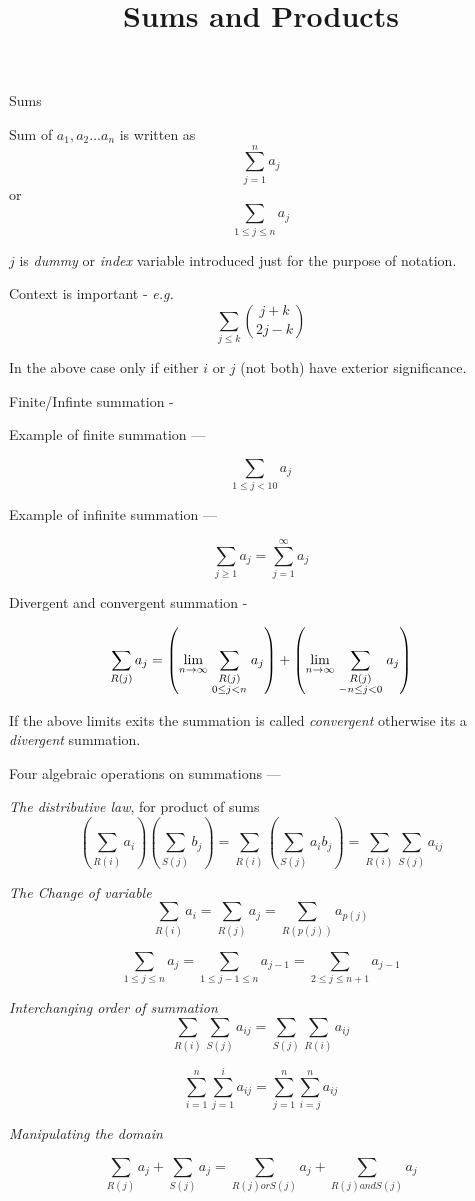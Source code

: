 \documentclass[12pt]{article}
\title{Sums and Products}
\begin{document}
\maketitle
  \begin{center}
    Sums
  \end{center}  
   Sum of $a_1,a_2 \ldots a_n$ is written as $$\sum_{j=1}^n {a_j} $$ or $$ \sum_{1 \le j \le n}a_j $$

   $j$ is {\sl dummy} or {\sl index} variable introduced just for the purpose of notation.

   Context is important - {\sl e.g.} $$ \sum _ {j \le k}{j+k \choose  2j -k}$$

   In the above case only if either $i$ or $j$ (not both) have exterior significance.

   Finite/Infinte summation -

   Example of finite summation ---

   $$ \sum_{1 \le j <10}{a_j} $$

   Example of infinite summation ---

   $$ \sum_{j \ge 1}{a_j} =  \sum_{j=1}^{\infty}{a_j} $$
   
   Divergent and convergent summation -

   $$  \sum_{R(j)}a_j = \left( \lim_{n\to\infty}\sum_{\scriptstyle R(j) \atop \scriptstyle 0  \le j < n} a_j \right) +
   \left( \lim_{n\to\infty}\sum_{\scriptstyle R(j) \atop  \scriptstyle -n \le j < 0}  a_j \right)  $$ 

   If the above limits exits the summation is called {\sl convergent} otherwise its a {\sl divergent} summation.

   Four algebraic operations on summations ---

   \begin{enumerate}
     \begin{item}
       {\sl The distributive law}, for product of sums
       $$ \left(\sum_{R(i)}a_i\right) \left(\sum_{S(j)}b_j\right) = \sum_{R(i)}\left(\sum_{S(j)}a_ib_j\right) = \sum_{R(i)}\sum_{S(j)}a_{ij} $$
     \end{item}
     \begin{item}
       {\sl The Change of variable}
       $$\sum_{R(i)}a_i = \sum_{R(j)}a_j = \sum_{R(p(j))}a_{p(j)} $$

       $$\sum_{1 \le j \le n}a_j = \sum_{1 \le j-1 \le n }a_{j-1} = \sum_{2 \le j \le n+1}a_{j-1} $$
       
     \end{item}
     \begin{item}
       {\sl Interchanging order of summation}
       $$\sum_{R(i)}\sum_{S(j)} a_{ij} = \sum_{S(j)}\sum_{R(i)} a_{ij} $$

       $$\sum_{i=1}^n\sum_{j=1}^i a_{ij} = \sum_{j=1}^n\sum_{i=j}^n a_{ij} $$
     \end{item}
     \begin{item}
       {\sl Manipulating the domain}

       $$ \sum_{R(j)} a_j +  \sum_{S(j)} a_j  =  \sum_{R(j) or S(j)} a_j +  \sum_{R(j) and S(j)} a_j $$
     \end{item}
   \end{enumerate}
   
\end{document}
